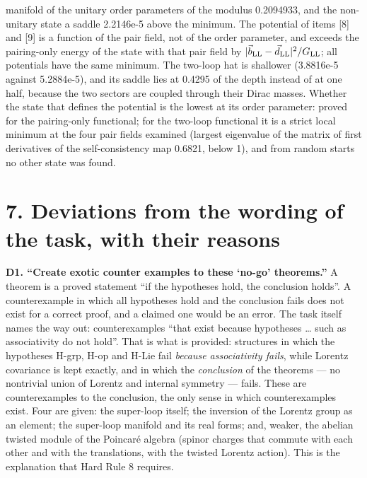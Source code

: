 \documentclass[
  10pt,
]{article}
\begin{document}
\begin{itemize}
  manifold of the unitary order parameters of the modulus 0.2094933, and
  the non-unitary state a saddle 2.2146e-5 above the minimum. The
  potential of items {[}8{]} and {[}9{]} is a function of the pair
  field, not of the order parameter, and exceeds the pairing-only energy
  of the state with that pair field by
  \(\lvert\vec b_{\rm LL}-\vec d_{\rm LL}\rvert^2/G_{\rm LL}\); all
  potentials have the same minimum. The two-loop hat is shallower
  (3.8816e-5 against 5.2884e-5), and its saddle lies at 0.4295 of the
  depth instead of at one half, because the two sectors are coupled
  through their Dirac masses. Whether the state that defines the
  potential is the lowest at its order parameter: proved for the
  pairing-only functional; for the two-loop functional it is a strict
  local minimum at the four pair fields examined (largest eigenvalue of
  the matrix of first derivatives of the self-consistency map 0.6821,
  below 1), and from random starts no other state was found.
\end{itemize}

\hypertarget{deviations-from-the-wording-of-the-task-with-their-reasons}{%
\section{7. Deviations from the wording of the task, with their
reasons}\label{deviations-from-the-wording-of-the-task-with-their-reasons}}

\textbf{D1. ``Create exotic counter examples to these `no-go'
theorems.''} A theorem is a proved statement ``if the hypotheses hold,
the conclusion holds''. A counterexample in which all hypotheses hold
and the conclusion fails does not exist for a correct proof, and a
claimed one would be an error. The task itself names the way out:
counterexamples ``that exist because hypotheses \ldots{} such as
associativity do not hold''. That is what is provided: structures in
which the hypotheses H-grp, H-op and H-Lie fail \emph{because
associativity fails}, while Lorentz covariance is kept exactly, and in
which the \emph{conclusion} of the theorems --- no nontrivial union of
Lorentz and internal symmetry --- fails. These are counterexamples to
the conclusion, the only sense in which counterexamples exist. Four are
given: the super-loop itself; the inversion of the Lorentz group as an
element; the super-loop manifold and its real forms; and, weaker, the
abelian twisted module of the Poincaré algebra (spinor charges that
commute with each other and with the translations, with the twisted
Lorentz action). This is the explanation that Hard Rule 8 requires.
\end{document}

